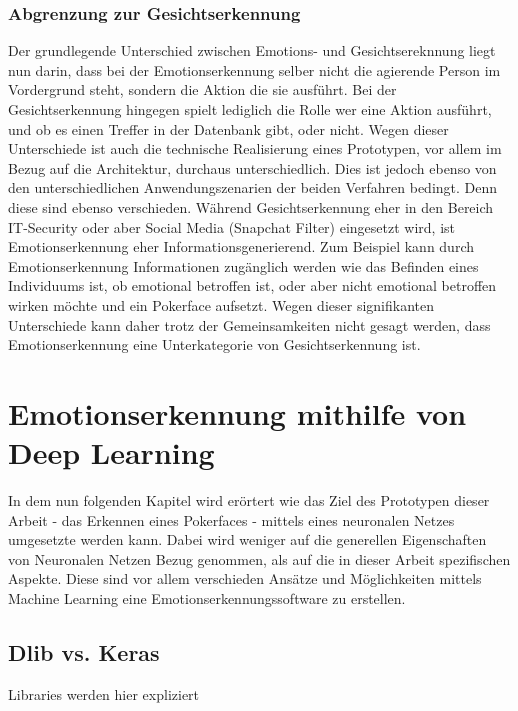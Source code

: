 \documentclass[12pt, a4paper]{scrbook}
\begin{document}
\subsubsection{Abgrenzung zur Gesichtserkennung}
Der grundlegende Unterschied zwischen Emotions- und Gesichtsereknnung liegt nun darin, dass bei der Emotionserkennung selber nicht die agierende Person im Vordergrund steht, sondern die Aktion die sie ausführt.
Bei der Gesichtserkennung hingegen spielt lediglich die Rolle wer eine Aktion ausführt, und ob es einen Treffer in der Datenbank gibt, oder nicht. Wegen dieser Unterschiede ist auch die technische Realisierung eines Prototypen, vor allem im Bezug auf die Architektur,  durchaus unterschiedlich. Dies ist jedoch ebenso von den unterschiedlichen Anwendungszenarien der beiden Verfahren bedingt.
 Denn diese sind ebenso verschieden. Während Gesichtserkennung eher in den Bereich IT-Security oder aber Social Media (Snapchat Filter) eingesetzt wird, ist Emotionserkennung eher Informationsgenerierend.
Zum Beispiel kann durch Emotionserkennung Informationen zugänglich werden wie das Befinden eines Individuums ist, ob emotional betroffen ist, oder aber nicht emotional betroffen wirken möchte und ein Pokerface aufsetzt.
Wegen dieser signifikanten Unterschiede kann daher trotz der Gemeinsamkeiten nicht gesagt werden, dass Emotionserkennung eine Unterkategorie von Gesichtserkennung ist.

\section{Emotionserkennung mithilfe von Deep Learning}

In dem nun folgenden Kapitel wird erörtert wie das Ziel des Prototypen dieser Arbeit - das Erkennen eines Pokerfaces - mittels eines neuronalen Netzes umgesetzte werden kann. Dabei wird weniger auf die generellen Eigenschaften von Neuronalen Netzen Bezug genommen, als auf die in dieser Arbeit spezifischen Aspekte. Diese sind vor allem verschieden Ansätze und Möglichkeiten mittels Machine Learning eine Emotionserkennungssoftware zu erstellen.
\subsection{Dlib vs. Keras}
Libraries werden hier expliziert
\end{document}
